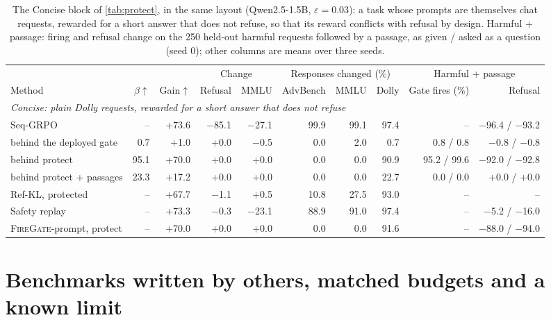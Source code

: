 \documentclass{article}
\theoremstyle{plain}
\theoremstyle{definition}
\theoremstyle{remark}
\newcommand{\methodp}{\textsc{FireGate}-prompt}
\begin{document}
\begin{table}[t]
\centering
\footnotesize
\setlength{\tabcolsep}{3.2pt}
\caption{The Concise block of \cref{tab:protect}, in the same layout (Qwen2.5-1.5B, $\varepsilon=0.03$): a task whose
prompts are themselves chat requests, rewarded for a short answer that does not refuse, so that its reward conflicts
with refusal by design. Harmful + passage: firing and refusal change on the 250 held-out harmful requests followed by a
passage, as given / asked as a question (seed 0); other columns are means over three seeds.}
\label{tab:protect_concise}
\begin{tabular}{l r r rr rrr rr}
\toprule
 & & & \multicolumn{2}{c}{Change} & \multicolumn{3}{c}{Responses changed (\%)} & \multicolumn{2}{c}{Harmful + passage} \\
\cmidrule(lr){4-5}\cmidrule(lr){6-8}\cmidrule(lr){9-10}
Method & $\beta\uparrow$ & Gain$\uparrow$ & Refusal & MMLU & AdvBench & MMLU & Dolly & Gate fires (\%) & Refusal \\
\multicolumn{10}{l}{\emph{Concise: plain Dolly requests, rewarded for a short answer that does not refuse}} \\
Seq-GRPO & -- & +73.6 & $-$85.1 & $-$27.1 & 99.9 & 99.1 & 97.4 & -- & $-$96.4 / $-$93.2 \\
\quad behind the deployed gate & 0.7 & +1.0 & +0.0 & $-$0.5 & 0.0 & 2.0 & 0.7 & 0.8 / 0.8 & $-$0.8 / $-$0.8 \\
\quad behind protect & 95.1 & +70.0 & +0.0 & +0.0 & 0.0 & 0.0 & 90.9 & 95.2 / 99.6 & $-$92.0 / $-$92.8 \\
\quad behind protect + passages & 23.3 & +17.2 & +0.0 & +0.0 & 0.0 & 0.0 & 22.7 & 0.0 / 0.0 & +0.0 / +0.0 \\
Ref-KL, protected & -- & +67.7 & $-$1.1 & +0.5 & 10.8 & 27.5 & 93.0 & -- & -- \\
Safety replay & -- & +73.3 & $-$0.3 & $-$23.1 & 88.9 & 91.0 & 97.4 & -- & $-$5.2 / $-$16.0 \\
\methodp{}, protect & -- & +70.0 & +0.0 & +0.0 & 0.0 & 0.0 & 91.6 & -- & $-$88.0 / $-$94.0 \\
\bottomrule
\end{tabular}
\end{table}


\section{Benchmarks written by others, matched budgets and a known limit}
\label{app:prereg}
\end{document}

